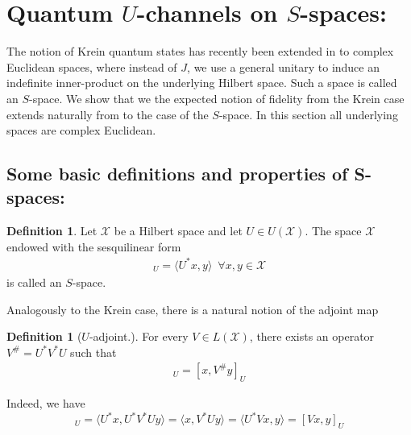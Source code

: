 \documentclass{amsart}
\numberwithin{equation}{section}
\theoremstyle{definition}
\newtheorem{definition}[theorem]{Definition}
\theoremstyle{plain}
\theoremstyle{solutionstyle}
\begin{document}
\section{Quantum \texorpdfstring{$U$}{U}-channels on \texorpdfstring{$S$}{S}-spaces:}\label{Section 8}
The notion of Krein quantum states has recently been extended in \cite{bag2024quantumuchannelssspaces} to complex Euclidean spaces, where instead of $J$, we use a general unitary to induce an indefinite inner-product on the underlying Hilbert space. Such a space is called an $S$-space. We show that we the expected notion of fidelity from the Krein case extends naturally from to the case of the $S$-space. In this section all underlying spaces are complex Euclidean.
\subsection{Some basic definitions and properties of S-spaces:}
\begin{definition}
    Let $\mathcal{X}$ be a Hilbert space and let $U\in U(\mathcal{X})$. The space $\mathcal{X}$ endowed with the sesquilinear form
    \begin{align*}
        [x,y]_U=\langle U^*x ,y\rangle\,\,\,\forall x,y\in \mathcal{X} 
    \end{align*}
    is called an $S$-space\cite{bag2024quantumuchannelssspaces}.
\end{definition}
Analogously to the Krein case, there is a natural notion of the adjoint map
\begin{definition}[$U$-adjoint.]\cite{bag2024quantumuchannelssspaces}
    For every $V\in L(\mathcal{X})$, there exists an operator $V^\#=U^*V^*U$ such that 
    \begin{align*}
        [Vx,y]_U=[x,V^\#y]_U
    \end{align*}
\end{definition}
Indeed, we have 
\begin{equation*}[x,V^\#]_U=\langle U^*x,U^*V^*Uy\rangle=\langle x,V^*Uy\rangle=\langle U^*Vx,y\rangle=[Vx,y]_U \end{equation*}
\end{document}

